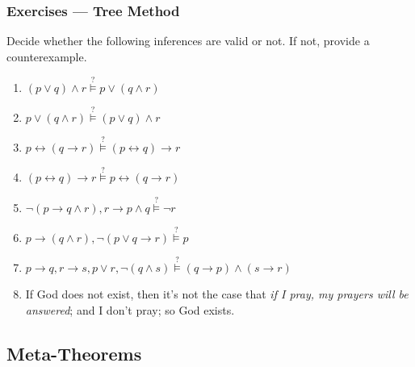 \documentclass[UTF8,aspectratio=43,11pt,colorlinks,compress,openany]{beamer}%
\begin{document}
\begin{frame}\frametitle{Exercises --- Tree Method}
Decide whether the following inferences are valid or not. If not, provide a counterexample.
\begin{enumerate}
	\item $(p\vee q)\wedge r\stackrel{?}{\vDash} p\vee(q\wedge r)$
	\item $p\vee(q\wedge r)\stackrel{?}{\vDash} (p\vee q)\wedge r$
	\item $p\leftrightarrow(q\to r)\stackrel{?}{\vDash}(p\leftrightarrow q)\to r$
	\item $(p\leftrightarrow q)\to r\stackrel{?}{\vDash}p\leftrightarrow(q\to r)$
	\item $\neg(p\to q\wedge r),r\to p\wedge q \stackrel{?}{\vDash}\neg r$
	\item $p\to(q\wedge r), \neg(p\vee q\to r)\stackrel{?}{\vDash}p$
	\item $p\to q, r\to s, p\vee r, \neg(q\wedge s)\stackrel{?}{\vDash}(q\to p)\wedge(s\to r)$
	\item If God does not exist, then it's not the case that \emph{if I pray, my prayers will be answered}; and I don't pray; so God exists.
\end{enumerate}
\end{frame}

\subsection{Meta-Theorems}
\end{document}

